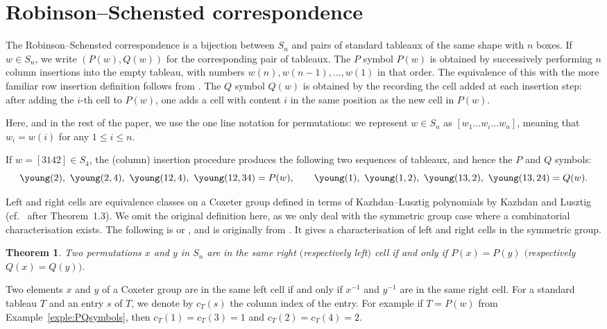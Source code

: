 \documentclass[10pt,a4paper]{amsart}
\numberwithin{equation}{section}
\newtheorem{Theorem}{Theorem}[section]
\newcommand{\inv}{^{-1}}
\begin{document}
\section{Robinson--Schensted correspondence}\label{sec:combinatorics}

The Robinson--Schensted correspondence is a bijection between $S_n$ and pairs of standard tab\-leaux of the same shape with $n$ boxes. If $w\in S_n$, we write $(P(w),Q(w))$ for the corresponding pair of tableaux. The $P$ symbol $P(w)$ is obtained by successively performing $n$ column insertions into the empty tableau, with numbers $w(n),w(n-1),\dots,w(1)$ in that order. The equivalence of this with the more familiar row insertion definition follows from \cite[Lemma 7.23.15]{stanley}. The $Q$ symbol $Q(w)$ is obtained by the recording the cell added at each insertion step: after adding the $i$-th cell to $P(w)$, one adds a cell with content $i$ in the same position as the new cell in $P(w)$.

Here, and in the rest of the paper, we use the one line notation for permutations: we represent $w\in S_n$ as $[w_1\dots w_i\dots w_n]$, meaning that $w_i=w(i)$ for any $1\leq i\leq n$.
\begin{Example}\label{exple:PQsymbols}If $w=[3142]\in S_4$, the (column) insertion procedure produces the following two sequences of tableaux, and hence the $P$ and $Q$ symbols:
\[
\young(2), \ \young(2,4), \ \young(12,4), \ \young(12,34)=P(w),
\qquad
\young(1), \ \young(1,2), \ \young(13,2), \ \young(13,24)=Q(w).
\]
\end{Example}

Left and right cells are equivalence classes on a Coxeter group defined in terms of Kazhdan--Lusztig polynomials by Kazhdan and Lusztig (cf.~\cite{KL79} after Theorem~1.3). We omit the original definition here, as we only deal with the symmetric group case where a combinatorial characterisation exists. The following is
\cite[Theorem~A]{ariki} or \cite[Fact~8]{gm}, and is originally from \cite[Section~5]{KL79}.
It gives a characterisation of left and right cells in the symmetric group.

\begin{Theorem}\label{thm:defnCells}
Two permutations $x$ and $y$ in $S_n$ are in the same right $($respectively left$)$ cell if and only if $P(x)=P(y)$ $($respectively $Q(x)=Q(y))$.
\end{Theorem}

Two elements $x$ and $y$ of a Coxeter group are in the same left cell if and only if $x\inv$ and $y\inv$ are in the same right cell.
For a standard tableau $T$ and an entry $s$ of $T$, we denote by $c_T(s)$ the column index of the entry. For example if $T=P(w)$ from Example~\ref{exple:PQsymbols}, then
\(c_T(1)=c_T(3)=1\) and \(c_T(2)=c_T(4)=2\).
\end{document}
